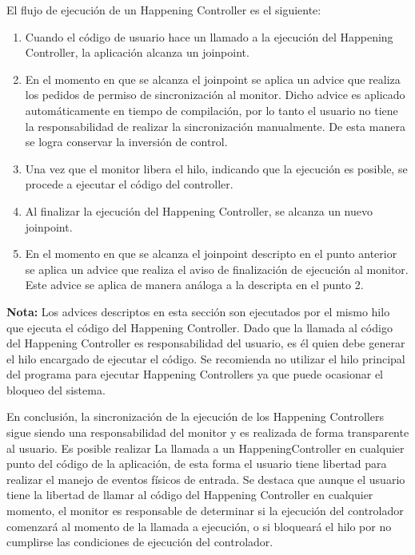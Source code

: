 El flujo de ejecución de un Happening Controller es el siguiente:
\begin{enumerate}
  \item Cuando el código de usuario hace un llamado a la ejecución del Happening
  Controller, la aplicación alcanza un joinpoint.
  \item En el momento en que se alcanza el joinpoint se aplica un advice que
  realiza los pedidos de permiso de sincronización al monitor. Dicho advice es
  aplicado automáticamente en tiempo de compilación, por lo tanto el usuario no
  tiene la responsabilidad de realizar la sincronización manualmente. De esta
  manera se logra conservar la inversión de control.
  \item Una vez que el monitor libera el hilo, indicando que la ejecución es
  posible, se procede a ejecutar el código del controller.
  \item Al finalizar la ejecución del Happening Controller, se alcanza un nuevo
  joinpoint.
  \item En el momento en que se alcanza el joinpoint descripto en el punto
  anterior se aplica un advice que realiza el aviso de finalización de
  ejecución al monitor. Este advice se aplica de manera análoga a la descripta
  en el punto 2.
\end{enumerate}

\begin{framed}
\textbf{Nota:} Los advices descriptos en esta sección son ejecutados por el
mismo hilo que ejecuta el código del Happening Controller. Dado que la llamada
al código del Happening Controller es responsabilidad del usuario, es él quien
debe generar el hilo encargado de ejecutar el código. Se recomienda no utilizar
el hilo principal del programa para ejecutar Happening Controllers ya que puede
ocasionar el bloqueo del sistema.
\end{framed}

En conclusión, la sincronización de la ejecución de los Happening Controllers
sigue siendo una responsabilidad del monitor y es realizada de forma
transparente al usuario. Es posible realizar La llamada a un HappeningController
en cualquier punto del código de la aplicación, de esta forma el usuario
tiene libertad para realizar el manejo de eventos físicos de entrada. Se destaca
que aunque el usuario tiene la libertad de llamar al código del Happening
Controller en cualquier momento, el monitor es responsable de determinar si
la ejecución del controlador comenzará al momento de la llamada a ejecución, o
si bloqueará el hilo por no cumplirse las condiciones de ejecución del controlador.

